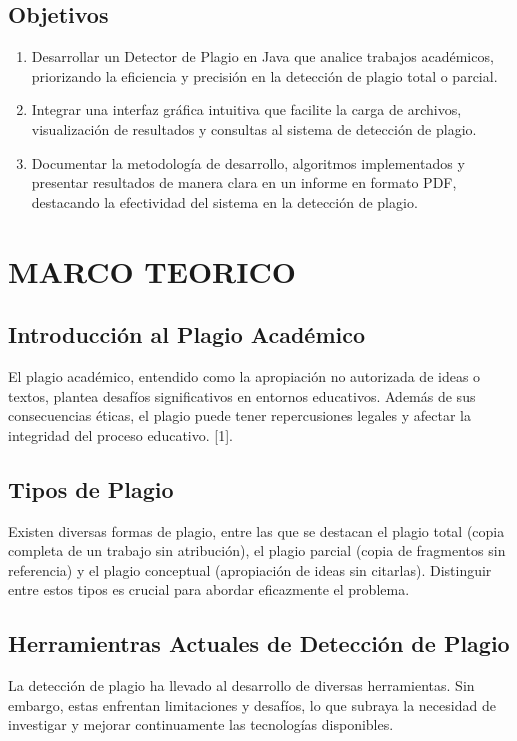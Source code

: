 \documentclass[a4paper]{article}
\begin{document}
\begin{multicols}{2}
\begin{justify}
\end{justify}


\subsection{Objetivos}

\begin{enumerate}
    \item Desarrollar un Detector de Plagio en Java que analice trabajos académicos, priorizando la eficiencia y precisión en la detección de plagio total o parcial.
    \item Integrar una interfaz gráfica intuitiva que facilite la carga de archivos, visualización de resultados y consultas al sistema de detección de plagio.
    \item Documentar la metodología de desarrollo, algoritmos implementados y presentar resultados de manera clara en un informe en formato PDF, destacando la efectividad del sistema en la detección de plagio.
\end{enumerate}

\section{MARCO TEORICO}
\subsection{Introducción al Plagio Académico}
El plagio académico, entendido como la apropiación no autorizada de ideas o textos, plantea desafíos significativos en entornos educativos. Además de sus consecuencias éticas, el plagio puede tener repercusiones legales y afectar la integridad del proceso educativo. [1].

\subsection{Tipos de Plagio}
Existen diversas formas de plagio, entre las que se destacan el plagio total (copia completa de un trabajo sin atribución), el plagio parcial (copia de fragmentos sin referencia) y el plagio conceptual (apropiación de ideas sin citarlas). Distinguir entre estos tipos es crucial para abordar eficazmente el problema.

\subsection{Herramientras Actuales de Detección de Plagio}
La detección de plagio ha llevado al desarrollo de diversas herramientas. Sin embargo, estas enfrentan limitaciones y desafíos, lo que subraya la necesidad de investigar y mejorar continuamente las tecnologías disponibles.


\end{multicols}
\end{document}
